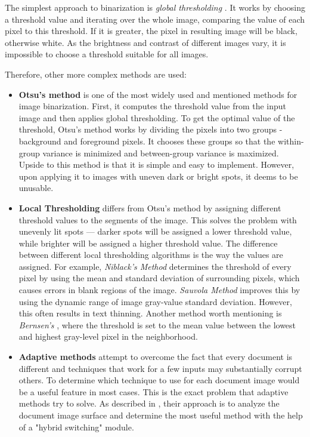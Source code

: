 The simplest approach to binarization is \emph{global thresholding} \citep{globalThresh}. It works by choosing a threshold value and iterating over the whole image, comparing the value of each pixel to this threshold. If it is greater, the pixel in resulting image will be black, otherwise white. As the brightness and contrast of different images vary, it is impossible to choose a threshold suitable for all images.

Therefore, other more complex methods are used:

\begin{itemize}
\item\textbf{Otsu's method} \citep{otsu} is one of the most widely used and mentioned methods for image binarization. First, it computes the threshold value from the input image and then applies global thresholding. To get the optimal value of the threshold, Otsu's method works by dividing the pixels into two groups - background and foreground pixels. It chooses these groups so that the within-group variance is minimized and between-group variance is maximized. Upside to this method is that it is simple and easy to implement. However, upon applying it to images with uneven dark or bright spots, it deems to be unusable.

\item\textbf{Local Thresholding} \citep{localOtherBin} differs from Otsu's method by assigning different threshold values to the segments of the image. This solves the problem with unevenly lit spots --- darker spots will be assigned a lower threshold value, while brighter will be assigned a higher threshold value. The difference between different local thresholding algorithms is the way the values are assigned. For example, \emph{Niblack's Method} \citep{adaptiveBin} determines the threshold of every pixel by using the mean and standard deviation of surrounding pixels, which causes errors in blank regions of the image. \emph{Sauvola Method} \citep{adaptiveBin} improves this by using the dynamic range of image gray-value standard deviation. However, this often results in text thinning. Another method worth mentioning is \emph{Bernsen's} \citep{adaptiveBin}, where the threshold is set to the mean value between the lowest and highest gray-level pixel in the neighborhood.

\item\textbf{Adaptive methods} attempt to overcome the fact that every document is different and techniques that work for a few inputs may substantially corrupt others. To determine which technique to use for each document image would be a useful feature in most cases. This is the exact problem that adaptive methods try to solve. As described in \citep{adaptiveBin}, their approach is to analyze the document image surface and determine the most useful method with the help of a "hybrid switching" module.

\end{itemize}

